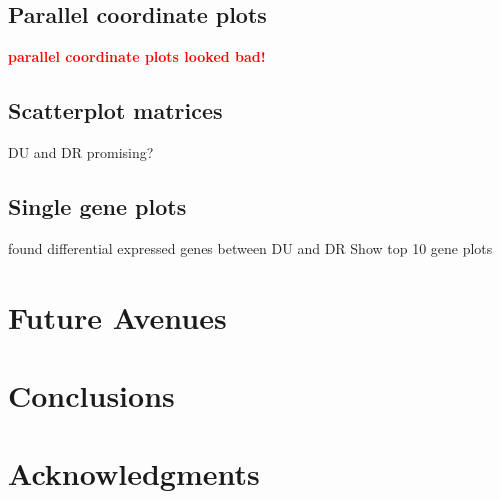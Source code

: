 \documentclass[11pt,a4paper,oldfontcommands,openany]{memoir}
\numberwithin{equation}{section} %
\begin{document}
\subsection{Parallel coordinate plots}
\textbf{\textcolor{Red}{parallel coordinate plots looked bad!}}
\subsection{Scatterplot matrices}
DU and DR promising?
\subsection{Single gene plots}
found differential expressed genes between DU and DR
Show top 10 gene plots

\section{Future Avenues}
\section{Conclusions}
\section{Acknowledgments}


\end{document}
